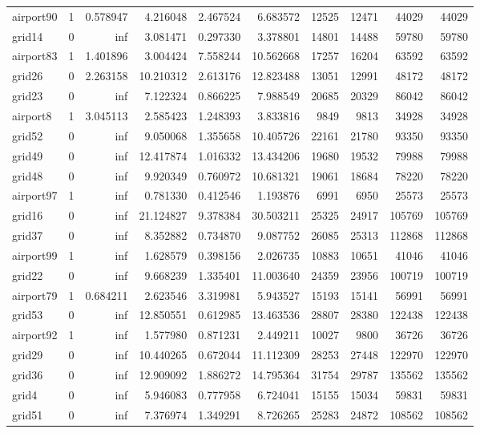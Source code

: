 \begin{longtable}{|l|r|r|r|r|r|r|r|r|r|}
airport90 & 1 & 0.578947 & 4.216048 & 2.467524 & 6.683572 & 12525 & 12471 & 44029 & 44029 \\
grid14 & 0 & inf & 3.081471 & 0.297330 & 3.378801 & 14801 & 14488 & 59780 & 59780 \\
airport83 & 1 & 1.401896 & 3.004424 & 7.558244 & 10.562668 & 17257 & 16204 & 63592 & 63592 \\
grid26 & 0 & 2.263158 & 10.210312 & 2.613176 & 12.823488 & 13051 & 12991 & 48172 & 48172 \\
grid23 & 0 & inf & 7.122324 & 0.866225 & 7.988549 & 20685 & 20329 & 86042 & 86042 \\
airport8 & 1 & 3.045113 & 2.585423 & 1.248393 & 3.833816 & 9849 & 9813 & 34928 & 34928 \\
grid52 & 0 & inf & 9.050068 & 1.355658 & 10.405726 & 22161 & 21780 & 93350 & 93350 \\
grid49 & 0 & inf & 12.417874 & 1.016332 & 13.434206 & 19680 & 19532 & 79988 & 79988 \\
grid48 & 0 & inf & 9.920349 & 0.760972 & 10.681321 & 19061 & 18684 & 78220 & 78220 \\
airport97 & 1 & inf & 0.781330 & 0.412546 & 1.193876 & 6991 & 6950 & 25573 & 25573 \\
grid16 & 0 & inf & 21.124827 & 9.378384 & 30.503211 & 25325 & 24917 & 105769 & 105769 \\
grid37 & 0 & inf & 8.352882 & 0.734870 & 9.087752 & 26085 & 25313 & 112868 & 112868 \\
airport99 & 1 & inf & 1.628579 & 0.398156 & 2.026735 & 10883 & 10651 & 41046 & 41046 \\
grid22 & 0 & inf & 9.668239 & 1.335401 & 11.003640 & 24359 & 23956 & 100719 & 100719 \\
airport79 & 1 & 0.684211 & 2.623546 & 3.319981 & 5.943527 & 15193 & 15141 & 56991 & 56991 \\
grid53 & 0 & inf & 12.850551 & 0.612985 & 13.463536 & 28807 & 28380 & 122438 & 122438 \\
airport92 & 1 & inf & 1.577980 & 0.871231 & 2.449211 & 10027 & 9800 & 36726 & 36726 \\
grid29 & 0 & inf & 10.440265 & 0.672044 & 11.112309 & 28253 & 27448 & 122970 & 122970 \\
grid36 & 0 & inf & 12.909092 & 1.886272 & 14.795364 & 31754 & 29787 & 135562 & 135562 \\
grid4 & 0 & inf & 5.946083 & 0.777958 & 6.724041 & 15155 & 15034 & 59831 & 59831 \\
grid51 & 0 & inf & 7.376974 & 1.349291 & 8.726265 & 25283 & 24872 & 108562 & 108562 \\

\end{longtable}
